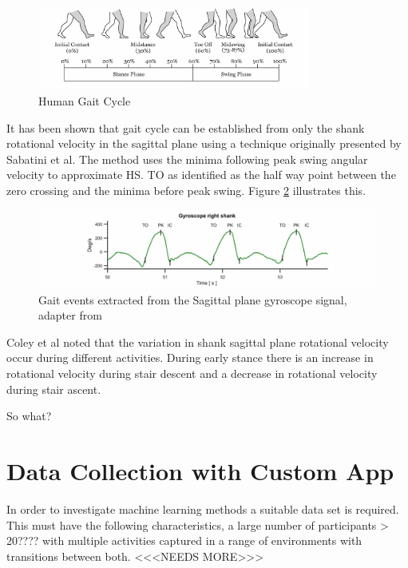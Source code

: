 \documentclass[sensors,article,submit,moreauthors,pdftex]{Definitions/mdpi}
\begin{document}
\begin{figure}[!htb]
    \centering
    \includegraphics[width=0.8\textwidth]{Figures/Gait_Cycle.jpg}
    \caption{Human Gait Cycle}
    \label{fig:gait_cycle}
\end{figure}

It has been shown that gait cycle can be established from only the shank rotational velocity in the sagittal plane using a technique originally presented by Sabatini et al\cite{Sabatini2005}. The method uses the minima following peak swing angular velocity to approximate HS. TO as identified as the half way point between the zero crossing and the minima before peak swing. Figure \ref{fig:y-gyro-hs-to} illustrates this.

\begin{figure}[!htb]
    \centering
    \includegraphics[width=\textwidth]{Figures/gyro_trace_hs.jpg}
    \caption{Gait events extracted from the Sagittal plane gyroscope signal, adapter from \cite{Sabatini2005}}
    \label{fig:y-gyro-hs-to}
\end{figure}

Coley et al noted that the variation in shank sagittal plane rotational velocity occur during different activities. During early stance there is an increase in rotational velocity during stair descent and a decrease in rotational velocity during stair ascent.\cite{Coley2005}

So what?


\section{Data Collection with Custom App}
In order to investigate machine learning methods a suitable data set is required. This must have the following characteristics, a large number of participants > 20???? with multiple activities captured in a range of environments with transitions between both. <<<NEEDS MORE>>>
\end{document}
